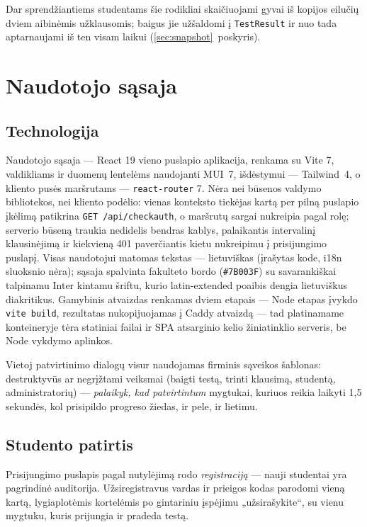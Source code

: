 \documentclass[11pt,a4paper]{article}
\newcommand{\code}[1]{\texttt{#1}}
\begin{document}
Dar sprendžiantiems studentams šie rodikliai skaičiuojami gyvai iš
kopijos eilučių dviem aibinėmis užklausomis; baigus jie užšaldomi į
\code{TestResult} ir nuo tada aptarnaujami iš ten visam laikui
(\ref{sec:snapshot}~poskyris).

\section{Naudotojo sąsaja}
\label{sec:frontend}

\subsection{Technologija}

Naudotojo sąsaja — React 19 vieno puslapio aplikacija, renkama su
Vite 7, valdikliams ir duomenų lentelėms naudojanti MUI~7, išdėstymui
— Tailwind~4, o kliento pusės maršrutams — \code{react-router} 7.
Nėra nei būsenos valdymo bibliotekos, nei kliento podėlio: vienas
konteksto tiekėjas kartą per pilną puslapio įkėlimą patikrina
\code{GET /api/checkauth}, o maršrutų sargai nukreipia pagal rolę;
serverio būseną traukia nedidelis bendras kablys, palaikantis
intervalinį klausinėjimą ir kiekvieną 401 paverčiantis kietu
nukreipimu į prisijungimo puslapį. Visas naudotojui matomas tekstas —
lietuviškas (įrašytas kode, i18n sluoksnio nėra); sąsaja spalvinta
fakulteto bordo (\code{\#7B003F}) su savarankiškai talpinamu Inter
kintamu šriftu, kurio latin-extended poaibis dengia lietuviškus
diakritikus. Gamybinis atvaizdas renkamas dviem etapais — Node etapas
įvykdo \code{vite build}, rezultatas nukopijuojamas į Caddy atvaizdą
— tad platinamame konteineryje tėra statiniai failai ir SPA
atsarginio kelio žiniatinklio serveris, be Node vykdymo aplinkos.

Vietoj patvirtinimo dialogų visur naudojamas firminis sąveikos
šablonas: destruktyvūs ar negrįžtami veiksmai (baigti testą, trinti
klausimą, studentą, administratorių) — \emph{palaikyk, kad
patvirtintum} mygtukai, kuriuos reikia laikyti 1,5 sekundės, kol
prisipildo progreso žiedas, ir pele, ir lietimu.

\subsection{Studento patirtis}

Prisijungimo puslapis pagal nutylėjimą rodo \emph{registraciją} —
nauji studentai yra pagrindinė auditorija. Užsiregistravus vardas ir
prieigos kodas parodomi vieną kartą, lygiaplotėmis kortelėmis po
gintariniu įspėjimu „užsirašykite``, su vienu mygtuku, kuris
prijungia ir pradeda testą.
\end{document}

